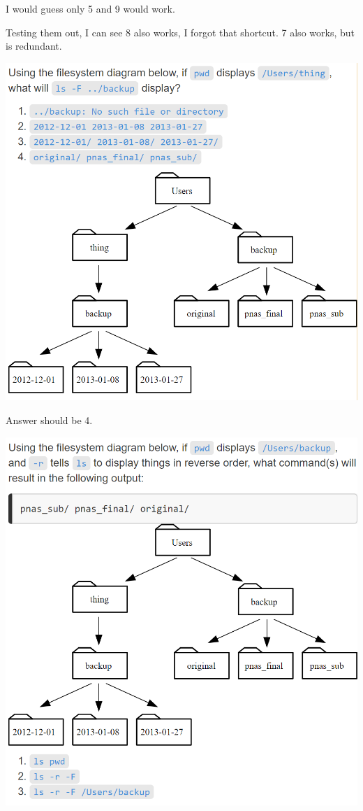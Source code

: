 \documentclass[12pt]{article}
\begin{document}
I would guess only 5 and 9 would work. 

Testing them out, I can see 8 also works, I forgot that shortcut. 7 also works, but is redundant.

\begin{center}
\vspace{1em}
\includegraphics[scale=1]{relativepathresolution.PNG}
\end{center}

Answer should be 4.

\newpage
\begin{center}
\vspace{1em}
\includegraphics[scale=1]{readingcomprehension.PNG}
\end{center}
\end{document}
